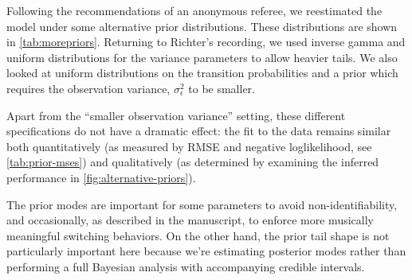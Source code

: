 \documentclass[aoas]{imsart}
\begin{document}
Following the recommendations of an anonymous referee, we reestimated
the model under some alternative prior distributions. These
distributions are shown in \autoref{tab:morepriors}. Returning to
Richter's recording, we used inverse gamma and uniform distributions for
the variance parameters to allow heavier tails. We also looked at
uniform distributions on the transition probabilities and a prior which
requires the observation variance, \(\sigma^2_\epsilon\) to be smaller.

Apart from the ``smaller observation variance'' setting, these different
specifications do not have a dramatic effect: the fit to the data
remains similar both quantitatively (as measured by RMSE and negative
loglikelihood, see \autoref{tab:prior-mses}) and qualitatively (as
determined by examining the inferred performance in
\autoref{fig:alternative-priors}).

The prior modes are important for some parameters to avoid
non-identifiability, and occasionally, as described in the manuscript,
to enforce more musically meaningful switching behaviors. On the other
hand, the prior tail shape is not particularly important here because
we're estimating posterior modes rather than performing a full Bayesian
analysis with accompanying credible intervals.
\end{document}
